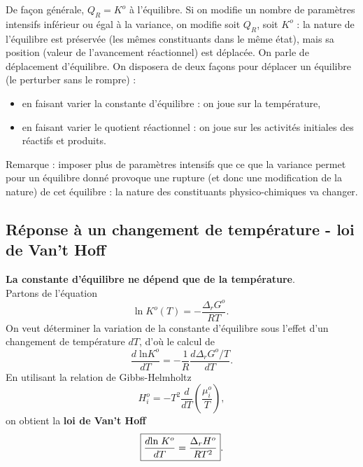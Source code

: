 \documentclass[11pt,a4paper]{report}
\begin{document}
De façon générale, $Q_R = K^o$ à l'équilibre. Si on modifie un nombre de paramètres intensifs inférieur ou égal à la variance, on modifie soit $Q_R$, soit $K^o$ : la nature de l'équilibre est préservée (les mêmes constituants dans le même état), mais sa position (valeur de l'avancement réactionnel) est déplacée. On parle de déplacement d'équilibre. On disposera de deux façons pour déplacer un équilibre (le perturber sans le rompre) :
\begin{itemize}
	\item en faisant varier la constante d'équilibre : on joue sur la température,
	\item en faisant varier le quotient réactionnel : on joue sur les activités initiales des réactifs et produits.\\
\end{itemize}

Remarque : imposer plus de paramètres intensifs que ce que la variance permet pour un équilibre donné provoque une rupture (et donc une modification de la nature) de cet équilibre : la nature des constituants physico-chimiques va changer.

\subsection{Réponse à un changement de température - loi de Van't Hoff}

\textbf{La constante d'équilibre ne dépend que de la température}.\\

Partons de l'équation
\begin{equation}
	\text{ln}\;K^o(T) = - \frac{\Delta_r G^o}{RT}.
\end{equation}
On veut déterminer la variation de la constante d'équilibre sous l'effet d'un changement de température $dT$, d'où le calcul de
\begin{equation}
	\frac{d\;\text{ln} K^o}{dT} = - \frac{1}{R}\frac{d \Delta_r G^o/T}{dT}.
\end{equation}
En utilisant la relation de Gibbs-Helmholtz
\begin{equation}
	H_i^o = -T^2 \frac{d}{dT}\left(\frac{\mu_i^o}{T}\right),
\end{equation}
on obtient la \textbf{loi de Van't Hoff}
\begin{equation}
	\boxed{\frac{d\text{ln}\;K^o}{dT} = \frac{\Delta_r H^o}{RT^2}}.\\
\end{equation}
\end{document}
